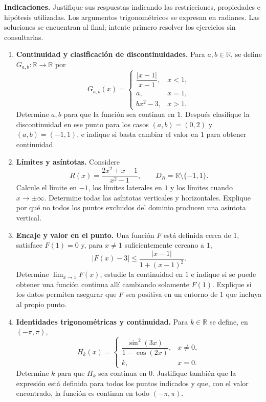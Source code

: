 \documentclass[10pt,a5paper]{article}
\begin{document}

\noindent\textbf{Indicaciones.} Justifique sus respuestas indicando las restricciones, propiedades e hipótesis utilizadas. Los argumentos trigonométricos se expresan en radianes. Las soluciones se encuentran al final; intente primero resolver los ejercicios sin consultarlas.

\begin{enumerate}
  \item \textbf{Continuidad y clasificación de discontinuidades.} Para $a,b\in\mathbb{R}$, se define $G_{a,b}\colon\mathbb{R}\to\mathbb{R}$ por
  \[
    G_{a,b}(x)=\begin{cases}
      \dfrac{|x-1|}{x-1},&x<1,\\[2mm]
      a,&x=1,\\
      bx^2-3,&x>1.
    \end{cases}
  \]
  Determine $a,b$ para que la función sea continua en $1$. Después clasifique la discontinuidad en ese punto para los casos $(a,b)=(0,2)$ y $(a,b)=(-1,1)$, e indique si basta cambiar el valor en $1$ para obtener continuidad.
  \item \textbf{Límites y asíntotas.} Considere
  \[
    R(x)=\frac{2x^2+x-1}{x^2-1},\qquad
    D_R=\mathbb{R}\setminus\{-1,1\}.
  \]
  Calcule el límite en $-1$, los límites laterales en $1$ y los límites cuando $x\to\pm\infty$. Determine todas las asíntotas verticales y horizontales. Explique por qué no todos los puntos excluidos del dominio producen una asíntota vertical.

  \item \textbf{Encaje y valor en el punto.} Una función $F$ está definida cerca de $1$, satisface $F(1)=0$ y, para $x\neq1$ suficientemente cercano a $1$,
  \[
    |F(x)-3|\leq\frac{|x-1|}{1+(x-1)^2}.
  \]
  Determine $\lim_{x\to1}F(x)$, estudie la continuidad en $1$ e indique si se puede obtener una función continua allí cambiando solamente $F(1)$. Explique si los datos permiten asegurar que $F$ sea positiva en un entorno de $1$ que incluya al propio punto.

  \item \textbf{Identidades trigonométricas y continuidad.} Para $k\in\mathbb{R}$ se define, en $(-\pi,\pi)$,
  \[
    H_k(x)=\begin{cases}
      \dfrac{\sin^2(3x)}{1-\cos(2x)},&x\neq0,\\[2mm]
      k,&x=0.
    \end{cases}
  \]
  Determine $k$ para que $H_k$ sea continua en $0$. Justifique también que la expresión está definida para todos los puntos indicados y que, con el valor encontrado, la función es continua en todo $(-\pi,\pi)$.


\end{enumerate}
\end{document}
